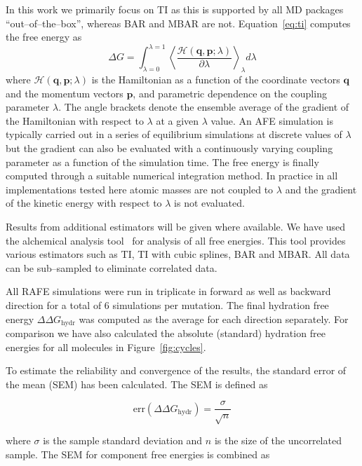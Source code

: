 \documentclass[journal=jctcce,manuscript=article]{achemso}
\renewcommand{\vec}[1]{\mathbf{#1}}
\begin{document}
In this work we primarily focus on TI as this is supported by all MD
packages ``out--of--the--box'', whereas BAR and MBAR are not.
Equation~\ref{eq:ti} computes the free energy as
\begin{equation}\label{eq:ti}
	\Delta G = \int_{\lambda=0}^{\lambda=1}
	\left\langle 
	\frac{\mathscr{H}(\vec{q},\vec{p};\lambda)}{\partial\lambda}\right\rangle_\lambda
	 d\lambda
\end{equation}
where $\mathscr{H}(\vec{q},\vec{p};\lambda)$ is the Hamiltonian as a function 
of the coordinate vectors $\vec{q}$ and the momentum vectors $\vec{p}$, and 
parametric dependence on the coupling parameter $\lambda$.  The angle brackets 
denote the ensemble average of the gradient of the Hamiltonian with respect to 
$\lambda$ at a given $\lambda$ value.  An AFE simulation is typically carried 
out in a series of equilibrium simulations at discrete values of $\lambda$ but 
the gradient can also be evaluated with a continuously varying coupling 
parameter as a function of the simulation time.  The free energy is finally 
computed through a suitable numerical integration method.
In practice in all implementations tested here atomic masses are not coupled to $\lambda$ and the gradient of the kinetic energy with respect to $\lambda$ is not evaluated.   

Results from additional estimators
will be given where available.  We have used the alchemical analysis
tool~\cite{klimovich_guidelines_2015} for analysis of all free energies.  This
tool provides various estimators such as TI, TI with cubic splines,
BAR and MBAR.  All data can be sub--sampled to eliminate correlated
data.

All RAFE simulations were run in triplicate in forward as well as
backward direction for a total of 6 simulations per mutation.  The
final hydration free energy $\Delta\Delta G_{\mathrm{hydr}}$ was
computed as the average for each direction separately.  For comparison we have 
also calculated the absolute (standard) hydration free energies for all
molecules in Figure~\ref{fig:cycles}.

To estimate the reliability and convergence of the results, the
standard error of the mean (SEM) has been calculated.  The SEM is
defined as

\begin{equation}
  \label{eq:sem}
  \mathrm{err}(\Delta\Delta G_{\mathrm{hydr}}) = \frac{\sigma}{\sqrt{n}}
\end{equation}

where $\sigma$ is the sample standard deviation and $n$ is the size of
the uncorrelated sample.  The SEM for component free energies is combined as
\end{document}
